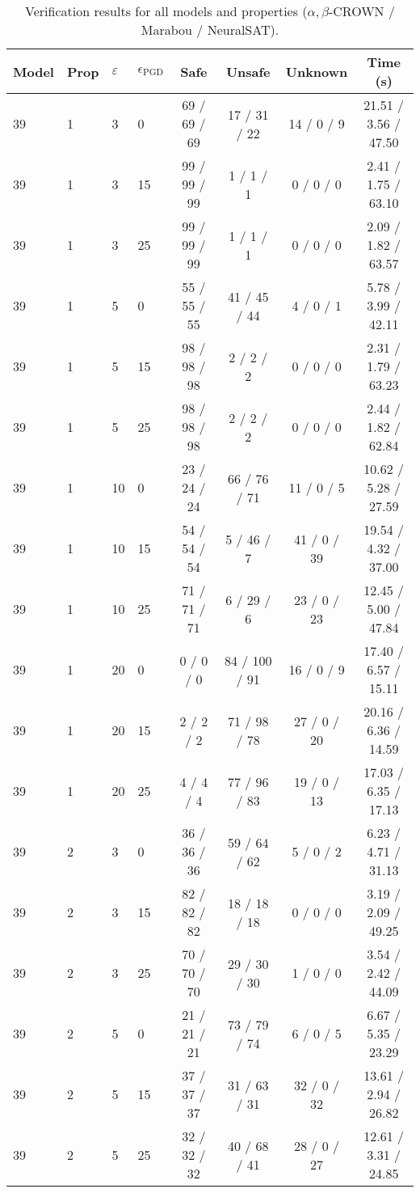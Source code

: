 \begin{table}[p]\centering
\caption{{\small Verification results for all models and properties ($\alpha,\beta$-CROWN / Marabou / NeuralSAT).}}
\label{tab:all_models_props}
\begin{tabular}{llllcccc}
\toprule
Model & Prop & $\varepsilon$ & $\epsilon_{\scriptscriptstyle\mathrm{PGD}}$ & Safe & Unsafe & Unknown & Time (s) \\
\midrule
39 & 1 & 3 & 0 & 69 / 69 / 69 & 17 / 31 / 22 & 14 / 0 / 9 & 21.51 / 3.56 / 47.50 \\
39 & 1 & 3 & 15 & 99 / 99 / 99 & 1 / 1 / 1 & 0 / 0 / 0 & 2.41 / 1.75 / 63.10 \\
39 & 1 & 3 & 25 & 99 / 99 / 99 & 1 / 1 / 1 & 0 / 0 / 0 & 2.09 / 1.82 / 63.57 \\
39 & 1 & 5 & 0 & 55 / 55 / 55 & 41 / 45 / 44 & 4 / 0 / 1 & 5.78 / 3.99 / 42.11 \\
39 & 1 & 5 & 15 & 98 / 98 / 98 & 2 / 2 / 2 & 0 / 0 / 0 & 2.31 / 1.79 / 63.23 \\
39 & 1 & 5 & 25 & 98 / 98 / 98 & 2 / 2 / 2 & 0 / 0 / 0 & 2.44 / 1.82 / 62.84 \\
39 & 1 & 10 & 0 & 23 / 24 / 24 & 66 / 76 / 71 & 11 / 0 / 5 & 10.62 / 5.28 / 27.59 \\
39 & 1 & 10 & 15 & 54 / 54 / 54 & 5 / 46 / 7 & 41 / 0 / 39 & 19.54 / 4.32 / 37.00 \\
39 & 1 & 10 & 25 & 71 / 71 / 71 & 6 / 29 / 6 & 23 / 0 / 23 & 12.45 / 5.00 / 47.84 \\
39 & 1 & 20 & 0 & 0 / 0 / 0 & 84 / 100 / 91 & 16 / 0 / 9 & 17.40 / 6.57 / 15.11 \\
39 & 1 & 20 & 15 & 2 / 2 / 2 & 71 / 98 / 78 & 27 / 0 / 20 & 20.16 / 6.36 / 14.59 \\
39 & 1 & 20 & 25 & 4 / 4 / 4 & 77 / 96 / 83 & 19 / 0 / 13 & 17.03 / 6.35 / 17.13 \\
39 & 2 & 3 & 0 & 36 / 36 / 36 & 59 / 64 / 62 & 5 / 0 / 2 & 6.23 / 4.71 / 31.13 \\
39 & 2 & 3 & 15 & 82 / 82 / 82 & 18 / 18 / 18 & 0 / 0 / 0 & 3.19 / 2.09 / 49.25 \\
39 & 2 & 3 & 25 & 70 / 70 / 70 & 29 / 30 / 30 & 1 / 0 / 0 & 3.54 / 2.42 / 44.09 \\
39 & 2 & 5 & 0 & 21 / 21 / 21 & 73 / 79 / 74 & 6 / 0 / 5 & 6.67 / 5.35 / 23.29 \\
39 & 2 & 5 & 15 & 37 / 37 / 37 & 31 / 63 / 31 & 32 / 0 / 32 & 13.61 / 2.94 / 26.82 \\
39 & 2 & 5 & 25 & 32 / 32 / 32 & 40 / 68 / 41 & 28 / 0 / 27 & 12.61 / 3.31 / 24.85 \\

\end{tabular}
\end{table}
